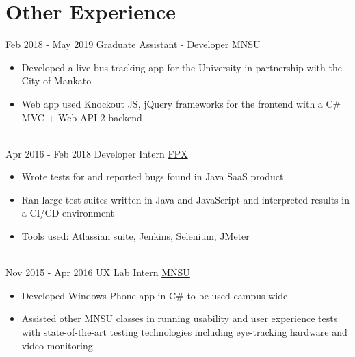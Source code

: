 \documentclass[a4paper]{twentysecondcv} %
\begin{document}
\pagebreak
\makesidebar %

\section{Other Experience}

\begin{twenty} %
    \twentyitem
    	{Feb 2018 -}
		{May 2019}
        {Graduate Assistant - Developer}
        {\href{https://mankato.mnsu.edu/}{MNSU}}
        {}
        {\begin{itemize}
        \item Developed a live bus tracking app for the University in partnership with the City of Mankato
        \item Web app used Knockout JS, jQuery frameworks for the  frontend with a C\# MVC + Web API 2 backend
        \end{itemize}}
        \\
	\twentyitem
    	{Apr 2016 -}
		{Feb 2018}
        {Developer Intern}
        {\href{https://www.fpx.com}{FPX}}
        {}
        {\begin{itemize}
        \item Wrote tests for and reported bugs found in Java SaaS product
        \item Ran large test suites written in Java and JavaScript and interpreted results in a CI/CD environment
        \item Tools used: Atlassian suite, Jenkins, Selenium, JMeter
        \end{itemize}}
    
    \\   
    \twentyitem
   		{Nov 2015 -}
		{Apr 2016}
        {UX Lab Intern}
        {\href{https://mankato.mnsu.edu/}{MNSU}}
        {}
        {
        {\begin{itemize}
        \item Developed Windows Phone app in C\# to be used campus-wide
        \item Assisted other MNSU classes in running usability and user experience tests with state-of-the-art testing technologies including eye-tracking hardware and video monitoring

    \end{itemize}}
        }

        
\end{twenty}
\end{document}
